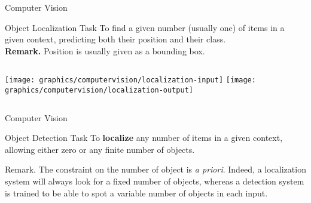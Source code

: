     \begin{frame}{Computer Vision}
        \begin{block}{Object Localization Task}
            To find a given number (usually one) of items in a given context, predicting both their position and their class. \\
            \textbf{Remark.} Position is usually given as a bounding box.
        \end{block}
        \begin{columns}[onlytextwidth]
            \texttt{[image: graphics/computervision/localization-input]}
            \texttt{[image: graphics/computervision/localization-output]}
        \end{columns}
    \end{frame}

    \begin{frame}{Computer Vision}
        \begin{description}
            \item<1->
                \begin{block}{Object Detection Task}
                    To \textbf{localize} any number of items in a given context, allowing either zero or any finite number of objects.
                \end{block}
            \item<2->
                \begin{alertblock}{Remark.}
                    The constraint on the number of object is \emph{a priori}. Indeed, a localization system will always look for a fixed number of objects, whereas a detection system is trained to be able to spot a variable number of objects in each input.
                \end{alertblock}
        \end{description}
    \end{frame}

